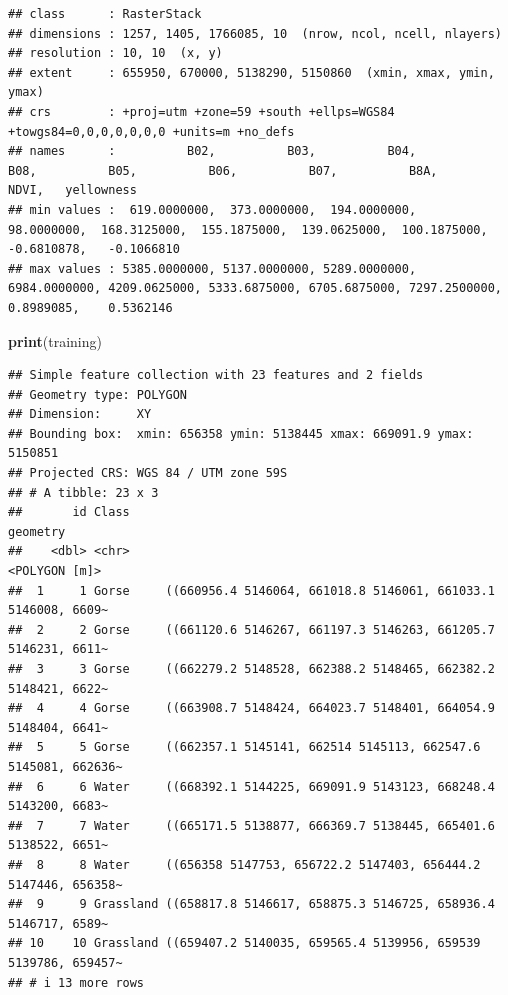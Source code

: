 \documentclass[
]{article}
\newenvironment{Shaded}{\begin{snugshade}}{\end{snugshade}}
\newcommand{\FunctionTok}[1]{\textcolor[rgb]{0.13,0.29,0.53}{\textbf{#1}}}
\newcommand{\NormalTok}[1]{#1}
\begin{document}
\begin{verbatim}
## class      : RasterStack 
## dimensions : 1257, 1405, 1766085, 10  (nrow, ncol, ncell, nlayers)
## resolution : 10, 10  (x, y)
## extent     : 655950, 670000, 5138290, 5150860  (xmin, xmax, ymin, ymax)
## crs        : +proj=utm +zone=59 +south +ellps=WGS84 +towgs84=0,0,0,0,0,0,0 +units=m +no_defs 
## names      :          B02,          B03,          B04,          B08,          B05,          B06,          B07,          B8A,         NDVI,   yellowness 
## min values :  619.0000000,  373.0000000,  194.0000000,   98.0000000,  168.3125000,  155.1875000,  139.0625000,  100.1875000,   -0.6810878,   -0.1066810 
## max values : 5385.0000000, 5137.0000000, 5289.0000000, 6984.0000000, 4209.0625000, 5333.6875000, 6705.6875000, 7297.2500000,    0.8989085,    0.5362146
\end{verbatim}

\begin{Shaded}
\begin{Highlighting}[]
\FunctionTok{print}\NormalTok{(training)}
\end{Highlighting}
\end{Shaded}

\begin{verbatim}
## Simple feature collection with 23 features and 2 fields
## Geometry type: POLYGON
## Dimension:     XY
## Bounding box:  xmin: 656358 ymin: 5138445 xmax: 669091.9 ymax: 5150851
## Projected CRS: WGS 84 / UTM zone 59S
## # A tibble: 23 x 3
##       id Class                                                          geometry
##    <dbl> <chr>                                                     <POLYGON [m]>
##  1     1 Gorse     ((660956.4 5146064, 661018.8 5146061, 661033.1 5146008, 6609~
##  2     2 Gorse     ((661120.6 5146267, 661197.3 5146263, 661205.7 5146231, 6611~
##  3     3 Gorse     ((662279.2 5148528, 662388.2 5148465, 662382.2 5148421, 6622~
##  4     4 Gorse     ((663908.7 5148424, 664023.7 5148401, 664054.9 5148404, 6641~
##  5     5 Gorse     ((662357.1 5145141, 662514 5145113, 662547.6 5145081, 662636~
##  6     6 Water     ((668392.1 5144225, 669091.9 5143123, 668248.4 5143200, 6683~
##  7     7 Water     ((665171.5 5138877, 666369.7 5138445, 665401.6 5138522, 6651~
##  8     8 Water     ((656358 5147753, 656722.2 5147403, 656444.2 5147446, 656358~
##  9     9 Grassland ((658817.8 5146617, 658875.3 5146725, 658936.4 5146717, 6589~
## 10    10 Grassland ((659407.2 5140035, 659565.4 5139956, 659539 5139786, 659457~
## # i 13 more rows
\end{verbatim}
\end{document}
